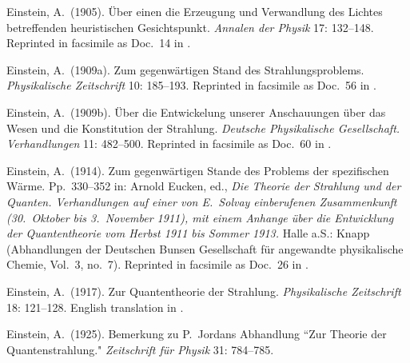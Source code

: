 \documentclass{elsart}
\begin{document}
{\begin{thebibliography}{}
 Einstein, A.\ (1905). \"Uber einen die Erzeugung und Verwandlung des Lichtes betreffenden heuristischen Gesichtspunkt. {\it Annalen der Physik} 17: 132--148. Reprinted in facsimile as Doc.\ 14 in \citep[Vol.\ 2]{Einstein 1987--2006}. 

 Einstein, A.\ (1909a). Zum gegenw\"artigen Stand des Strahlungsproblems. {\it Physikalische Zeitschrift} 10: 185--193. Reprinted in facsimile as Doc.\ 56 in \citep[Vol.\ 2]{Einstein 1987--2006}.

 Einstein, A.\ (1909b). \"Uber die Entwickelung unserer Anschauungen \"uber das Wesen und die Konstitution der Strahlung. {\it Deutsche Physikalische Gesellschaft. Verhandlungen} 11: 482--500. Reprinted in facsimile as Doc.\ 60 in \citep[Vol.\ 2]{Einstein 1987--2006}.

 Einstein, A.\ (1914). Zum gegenw\"artigen Stande des Problems der spezifischen W\"arme. Pp.\ 330--352 in: Arnold Eucken, ed., {\it Die Theorie der Strahlung und der Quanten. Verhandlungen auf einer von E.\ Solvay einberufenen Zusammenkunft (30.\ Oktober bis 3.\ November 1911), mit einem Anhange \"uber die Entwicklung der Quantentheorie vom Herbst 1911 bis Sommer 1913.} Halle a.S.: Knapp (Abhandlungen der Deutschen Bunsen Gesellschaft f\"ur angewandte physikalische Chemie, Vol.\ 3, no.\ 7). Reprinted in facsimile as Doc.\ 26 in \citep[Vol.\ 3]{Einstein 1987--2006}.



 Einstein, A.\ (1917). Zur Quantentheorie der Strahlung. {\it Physikalische Zeitschrift} 18: 121--128. English translation in \citep[pp.\ 63--77]{Van der Waerden}.

 Einstein, A.\ (1925). Bemerkung zu P.\ Jordans Abhandlung ``Zur Theorie der Quantenstrahlung." {\it Zeitschrift f\"{u}r Physik} 31: 784--785.



\end{thebibliography}}
\end{document}

